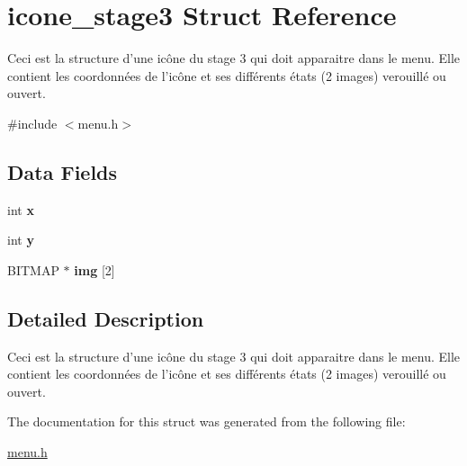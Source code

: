 \hypertarget{structicone__stage3}{\section{icone\-\_\-stage3 Struct Reference}
\label{structicone__stage3}
}


Ceci est la structure d'une icône du stage 3 qui doit apparaitre dans le menu. Elle contient les coordonnées de l'icône et ses différents états (2 images) verouillé ou ouvert.  




{\ttfamily \#include $<$menu.\-h$>$}

\subsection*{Data Fields}
\begin{DoxyCompactItemize}
\item 
\hypertarget{structicone__stage3_a6150e0515f7202e2fb518f7206ed97dc}{int {\bfseries x}}\label{structicone__stage3_a6150e0515f7202e2fb518f7206ed97dc}

\item 
\hypertarget{structicone__stage3_a0a2f84ed7838f07779ae24c5a9086d33}{int {\bfseries y}}\label{structicone__stage3_a0a2f84ed7838f07779ae24c5a9086d33}

\item 
\hypertarget{structicone__stage3_ab1bd34bcded6c8709b926189b4f50c2c}{B\-I\-T\-M\-A\-P $\ast$ {\bfseries img} \mbox{[}2\mbox{]}}\label{structicone__stage3_ab1bd34bcded6c8709b926189b4f50c2c}

\end{DoxyCompactItemize}


\subsection{Detailed Description}
Ceci est la structure d'une icône du stage 3 qui doit apparaitre dans le menu. Elle contient les coordonnées de l'icône et ses différents états (2 images) verouillé ou ouvert. 


\begin{DoxyItemize}
\item 
\end{DoxyItemize}

The documentation for this struct was generated from the following file\-:\begin{DoxyCompactItemize}
\item 
\hyperlink{menu_8h}{menu.\-h}\end{DoxyCompactItemize}
